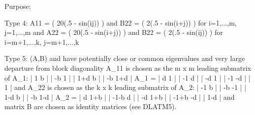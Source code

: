 \begin{DoxyParagraph}{Purpose\+: }
\begin{DoxyVerb}
 Type 4:  A11 = ( 20(.5 - sin(ij)) ) and B22 = ( 2(.5 - sin(i+j)) )
             for i=1,...,m,  j=1,...,m and
          A22 = ( 20(.5 - sin(i+j)) ) and B22 = ( 2(.5 - sin(ij)) )
             for i=m+1,...,k,  j=m+1,...,k

 Type 5:  (A,B) and have potentially close or common eigenvalues and
          very large departure from block diagonality A_11 is chosen
          as the m x m leading submatrix of A_1:
                  |  1  b                            |
                  | -b  1                            |
                  |        1+d  b                    |
                  |         -b 1+d                   |
           A_1 =  |                  d  1            |
                  |                 -1  d            |
                  |                        -d  1     |
                  |                        -1 -d     |
                  |                               1  |
          and A_22 is chosen as the k x k leading submatrix of A_2:
                  | -1  b                            |
                  | -b -1                            |
                  |       1-d  b                     |
                  |       -b  1-d                    |
           A_2 =  |                 d 1+b            |
                  |               -1-b d             |
                  |                       -d  1+b    |
                  |                      -1+b  -d    |
                  |                              1-d |
          and matrix B are chosen as identity matrices (see DLATM5).\end{DoxyVerb}
 
\end{DoxyParagraph}

